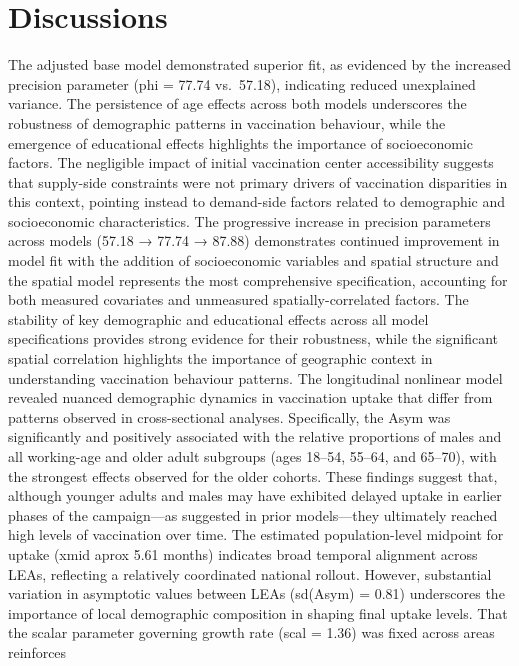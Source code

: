 \documentclass{article}
\begin{document}
\section{Discussions}\label{discussions}

The adjusted base model demonstrated superior fit, as evidenced by the
increased precision parameter (phi = 77.74 vs.~57.18), indicating
reduced unexplained variance. The persistence of age effects across both
models underscores the robustness of demographic patterns in vaccination
behaviour, while the emergence of educational effects highlights the
importance of socioeconomic factors. The negligible impact of initial
vaccination center accessibility suggests that supply-side constraints
were not primary drivers of vaccination disparities in this context,
pointing instead to demand-side factors related to demographic and
socioeconomic characteristics. The progressive increase in precision
parameters across models (57.18 → 77.74 → 87.88) demonstrates continued
improvement in model fit with the addition of socioeconomic variables
and spatial structure and the spatial model represents the most
comprehensive specification, accounting for both measured covariates and
unmeasured spatially-correlated factors. The stability of key
demographic and educational effects across all model specifications
provides strong evidence for their robustness, while the significant
spatial correlation highlights the importance of geographic context in
understanding vaccination behaviour patterns. The longitudinal nonlinear
model revealed nuanced demographic dynamics in vaccination uptake that
differ from patterns observed in cross-sectional analyses. Specifically,
the Asym was significantly and positively associated with the relative
proportions of males and all working-age and older adult subgroups (ages
18--54, 55--64, and 65--70), with the strongest effects observed for the
older cohorts. These findings suggest that, although younger adults and
males may have exhibited delayed uptake in earlier phases of the
campaign---as suggested in prior models---they ultimately reached high
levels of vaccination over time. The estimated population-level midpoint
for uptake (xmid aprox 5.61 months) indicates broad temporal alignment
across LEAs, reflecting a relatively coordinated national rollout.
However, substantial variation in asymptotic values between LEAs
(sd(Asym) = 0.81) underscores the importance of local demographic
composition in shaping final uptake levels. That the scalar parameter
governing growth rate (scal = 1.36) was fixed across areas reinforces
\end{document}
